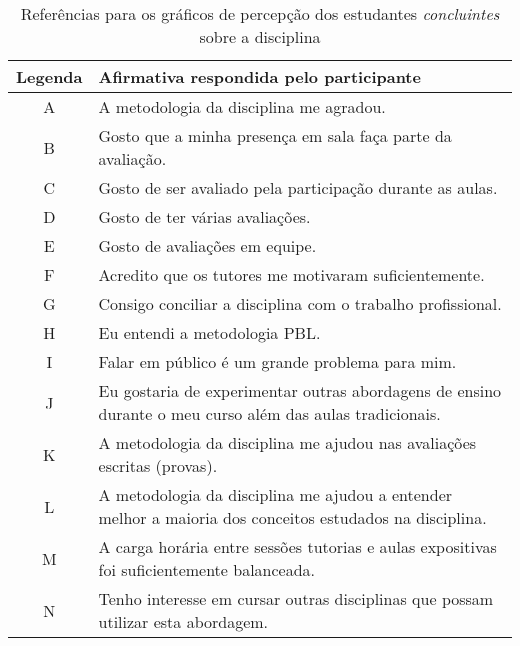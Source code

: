 \begin{table}[h]
\caption{Referências para os gráficos de percepção dos estudantes \textit{concluintes} sobre a disciplina}
\label{tabela-ref-graficos2}
\begin{tabular}{c|p{14.6cm}}
Legenda & Afirmativa respondida pelo participante \\
\hline
A & A metodologia da disciplina me agradou.\\
\hline
B & Gosto que a minha presença em sala faça parte da avaliação.\\
\hline
C & Gosto de ser avaliado pela participação durante as aulas.\\
\hline
D & Gosto de ter várias avaliações.\\
\hline
E & Gosto de avaliações em equipe.\\
\hline
F & Acredito que os tutores me motivaram suficientemente.\\
\hline
G & Consigo conciliar a disciplina com o trabalho profissional.\\
\hline
H & Eu entendi a metodologia PBL.\\
\hline
I & Falar em público é um grande problema para mim.\\
\hline
J & Eu gostaria de experimentar outras abordagens de ensino durante o meu curso além das aulas tradicionais.\\
\hline
K & A metodologia da disciplina me ajudou nas avaliações escritas (provas).\\
\hline
L & A metodologia da disciplina me ajudou a entender melhor a maioria dos conceitos estudados na disciplina.\\
\hline
M & A carga horária entre sessões tutorias e aulas expositivas foi suficientemente balanceada.\\
\hline
N & Tenho interesse em cursar outras disciplinas que possam utilizar esta abordagem.\\
\end{tabular}
\end{table}
